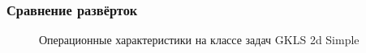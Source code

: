 \documentclass[aspectratio=1610]{beamer}
\begin{document}
\begin{frame}
  \frametitle{Сравнение развёрток}
  \begin{figure}[ht]
    \hspace*{-0.9cm}
     \hspace*{4cm}
    \caption{Операционные характеристики на классе задач GKLS 2d Simple}
  \end{figure}
\end{frame}
\end{document}
